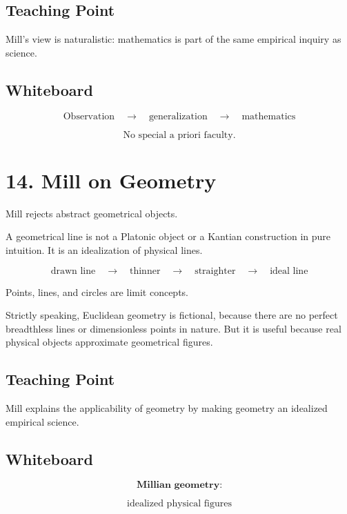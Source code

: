 \documentclass[11pt]{article}
\begin{document}
\subsection*{Teaching Point}

Mill's view is naturalistic: mathematics is part of the same empirical inquiry as science.

\subsection*{Whiteboard}

\[
\text{Observation}
\quad \longrightarrow \quad
\text{generalization}
\quad \longrightarrow \quad
\text{mathematics}
\]

\[
\text{No special a priori faculty.}
\]

\section*{14. Mill on Geometry}

Mill rejects abstract geometrical objects.

A geometrical line is not a Platonic object or a Kantian construction in pure intuition. It is
an idealization of physical lines.

\[
\text{drawn line}
\quad \rightarrow \quad
\text{thinner}
\quad \rightarrow \quad
\text{straighter}
\quad \rightarrow \quad
\text{ideal line}
\]

Points, lines, and circles are limit concepts.

Strictly speaking, Euclidean geometry is fictional, because there are no perfect
breadthless lines or dimensionless points in nature. But it is useful because real physical
objects approximate geometrical figures.

\subsection*{Teaching Point}

Mill explains the applicability of geometry by making geometry an idealized empirical
science.

\subsection*{Whiteboard}

\[
\textbf{Millian geometry:}
\]

\[
\text{idealized physical figures}
\]
\end{document}
